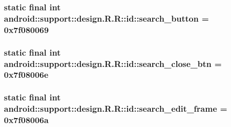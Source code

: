 \hypertarget{classandroid_1_1support_1_1design_1_1_r_1_1id_5727860297be51a7998142347794cc59}{
\subsubsection[{search\_\-button}]{\setlength{\rightskip}{0pt plus 5cm}static final int android::support::design.R.R::id::search\_\-button = 0x7f080069}}
\label{classandroid_1_1support_1_1design_1_1_r_1_1id_5727860297be51a7998142347794cc59}


\hypertarget{classandroid_1_1support_1_1design_1_1_r_1_1id_44154035becc80c3e7aba9417d6b684b}{
\subsubsection[{search\_\-close\_\-btn}]{\setlength{\rightskip}{0pt plus 5cm}static final int android::support::design.R.R::id::search\_\-close\_\-btn = 0x7f08006e}}
\label{classandroid_1_1support_1_1design_1_1_r_1_1id_44154035becc80c3e7aba9417d6b684b}


\hypertarget{classandroid_1_1support_1_1design_1_1_r_1_1id_80b5489f40efc5fcd7a46133fae1397b}{
\subsubsection[{search\_\-edit\_\-frame}]{\setlength{\rightskip}{0pt plus 5cm}static final int android::support::design.R.R::id::search\_\-edit\_\-frame = 0x7f08006a}}
\label{classandroid_1_1support_1_1design_1_1_r_1_1id_80b5489f40efc5fcd7a46133fae1397b}


